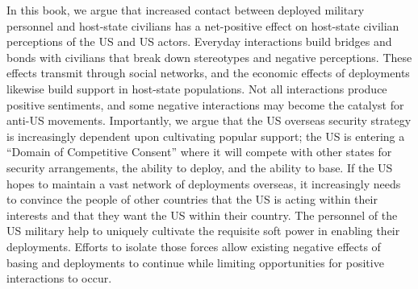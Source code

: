 In this book, we argue that increased contact between deployed military personnel and host-state civilians has a net-positive effect on host-state civilian perceptions of the US and US actors. Everyday interactions build bridges and bonds with civilians that break down stereotypes and negative perceptions. These effects transmit through social networks, and the economic effects of deployments likewise build support in host-state populations. Not all interactions produce positive sentiments, and some negative interactions may become the catalyst for anti-US movements. Importantly, we argue that the US overseas security strategy is increasingly dependent upon cultivating popular support; the US is entering a ``Domain of Competitive Consent'' where it will compete with other states for security arrangements, the ability to deploy, and the ability to base. If the US hopes to maintain a vast network of deployments overseas, it increasingly needs to convince the people of other countries that the US is acting within their interests and that they want the US within their country. The personnel of the US military help to uniquely cultivate the requisite soft power in enabling their deployments. Efforts to isolate those forces allow existing negative effects of basing and deployments to continue while limiting opportunities for positive interactions to occur.

